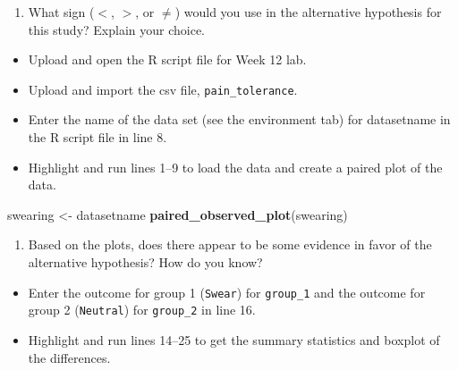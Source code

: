 \documentclass[
]{report}
\newenvironment{Shaded}{\begin{snugshade}}{\end{snugshade}}
\newcommand{\FunctionTok}[1]{\textcolor[rgb]{0.13,0.29,0.53}{\textbf{#1}}}
\newcommand{\NormalTok}[1]{#1}
\newcommand{\OtherTok}[1]{\textcolor[rgb]{0.56,0.35,0.01}{#1}}
\providecommand{\tightlist}{%
  \setlength{\itemsep}{0pt}\setlength{\parskip}{0pt}}
\begin{document}
\vspace{0.4in}

\begin{enumerate}
\def\labelenumi{\arabic{enumi}.}
\setcounter{enumi}{3}
\tightlist
\item
  What sign (\(<\), \(>\), or \(\neq\)) would you use in the alternative hypothesis for this study? Explain your choice.
\end{enumerate}

\vspace{0.5in}

\begin{itemize}
\item
  Upload and open the R script file for Week 12 lab.
\item
  Upload and import the csv file, \texttt{pain\_tolerance}.
\item
  Enter the name of the data set (see the environment tab) for datasetname in the R script file in line 8.
\item
  Highlight and run lines 1--9 to load the data and create a paired plot of the data.
\end{itemize}

\begin{Shaded}
\begin{Highlighting}[]
\NormalTok{swearing }\OtherTok{\textless{}{-}}\NormalTok{ datasetname}
\FunctionTok{paired\_observed\_plot}\NormalTok{(swearing)}
\end{Highlighting}
\end{Shaded}

\begin{enumerate}
\def\labelenumi{\arabic{enumi}.}
\setcounter{enumi}{4}
\tightlist
\item
  Based on the plots, does there appear to be some evidence in favor of the alternative hypothesis? How do you know?
  \vspace{0.4in}
\end{enumerate}

\begin{itemize}
\item
  Enter the outcome for group 1 (\texttt{Swear}) for \texttt{group\_1} and the outcome for group 2 (\texttt{Neutral}) for \texttt{group\_2} in line 16.
\item
  Highlight and run lines 14--25 to get the summary statistics and boxplot of the differences.
\end{itemize}
\end{document}

